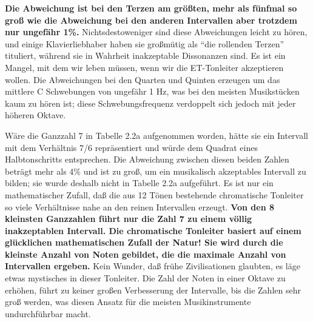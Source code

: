 \textbf{Die Abweichung ist bei den Terzen am größten, mehr als fünfmal so groß wie die Abweichung bei den anderen Intervallen aber trotzdem nur ungefähr 1\%.}
Nichtsdestoweniger sind diese Abweichungen leicht zu hören, und einige Klavierliebhaber haben sie großmütig als \enquote{die rollenden Terzen} tituliert, während sie in Wahrheit inakzeptable Dissonanzen sind.
Es ist ein Mangel, mit dem wir leben müssen, wenn wir die ET-Tonleiter akzeptieren wollen.
Die Abweichungen bei den Quarten und Quinten erzeugen um das mittlere C Schwebungen von ungefähr 1 Hz, was bei den meisten Musikstücken kaum zu hören ist; diese Schwebungsfrequenz verdoppelt sich jedoch mit jeder höheren Oktave.

Wäre die Ganzzahl 7 in Tabelle 2.2a aufgenommen worden, hätte sie ein Intervall mit dem Verhältnis 7/6 repräsentiert und würde dem Quadrat eines Halbtonschritts entsprechen.
Die Abweichung zwischen diesen beiden Zahlen beträgt mehr als 4\% und ist zu groß, um ein musikalisch akzeptables Intervall zu bilden; sie wurde deshalb nicht in Tabelle 2.2a aufgeführt.
Es ist nur ein mathematischer Zufall, daß die aus 12 Tönen bestehende chromatische Tonleiter so viele Verhältnisse nahe an den reinen Intervallen erzeugt.
\textbf{Von den 8 kleinsten Ganzzahlen führt nur die Zahl 7 zu einem völlig inakzeptablen Intervall.
Die chromatische Tonleiter basiert auf einem glücklichen mathematischen Zufall der Natur!
Sie wird durch die kleinste Anzahl von Noten gebildet, die die maximale Anzahl von Intervallen ergeben.}
Kein Wunder, daß frühe Zivilisationen glaubten, es läge etwas mystisches in dieser Tonleiter.
Die Zahl der Noten in einer Oktave zu erhöhen, führt zu keiner großen Verbesserung der Intervalle, bis die Zahlen sehr groß werden, was diesen Ansatz für die meisten Musikinstrumente undurchführbar macht.

